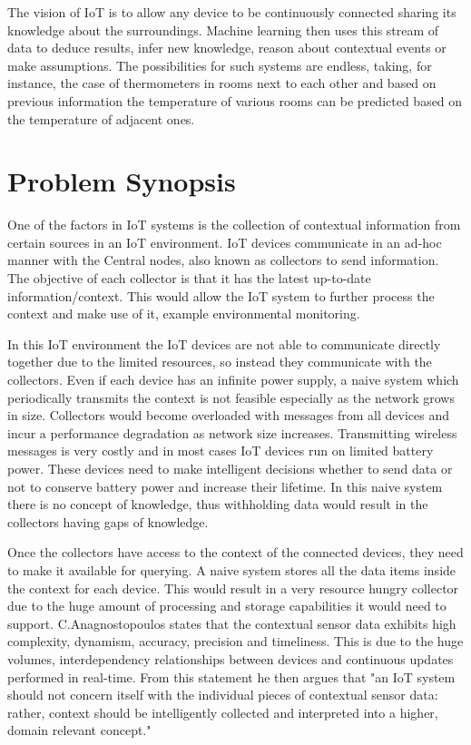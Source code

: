 \documentclass{mproj}
\begin{document}
The vision of IoT is to allow any device to be continuously connected sharing its knowledge about the surroundings. Machine learning then uses this stream of data to deduce results, infer new knowledge, reason about contextual events or make assumptions. The possibilities for such systems are endless, taking, for instance, the case of thermometers in rooms next to each other and based on previous information the temperature of various rooms can be predicted based on the temperature of adjacent ones.

\section{Problem Synopsis}
One of the factors in IoT systems is the collection of contextual information from certain sources in an IoT environment.\cite{intelligentContextualInformation} IoT devices communicate in an ad-hoc manner with the Central nodes, also known as collectors to send information. The objective of each collector is that it has the latest up-to-date information/context. This would allow the IoT system to further process the context and make use of it, example environmental monitoring.

In this IoT environment the IoT devices are not able to communicate directly together due to the limited resources, so instead they communicate with the collectors. Even if each device has an infinite power supply, a naive system which periodically transmits the context is not feasible especially as the network grows in size. Collectors would become overloaded with messages from all devices and incur a performance degradation as network size increases. Transmitting wireless messages is very costly and in most cases IoT devices run on limited battery power. These devices need to make intelligent decisions whether to send data or not to conserve battery power and increase their lifetime. In this naive system there is no concept of knowledge, thus withholding data would result in the collectors having gaps of knowledge.

Once the collectors have access to the context of the connected devices, they need to make it available for querying. A naive system stores all the data items inside the context for each device. This would result in a very resource hungry collector due to the huge amount of processing and storage capabilities it would need to support. C.Anagnostopoulos \cite{intelligentContextualInformation} states that the contextual sensor data exhibits high complexity, dynamism, accuracy, precision and timeliness. This is due to the huge volumes, interdependency relationships between devices and continuous updates performed in real-time. From this statement he then argues that "an IoT system should not concern itself with the individual pieces of contextual sensor data: rather, context should be intelligently collected and interpreted into a higher, domain relevant concept."\cite{intelligentContextualInformation}
\end{document}
